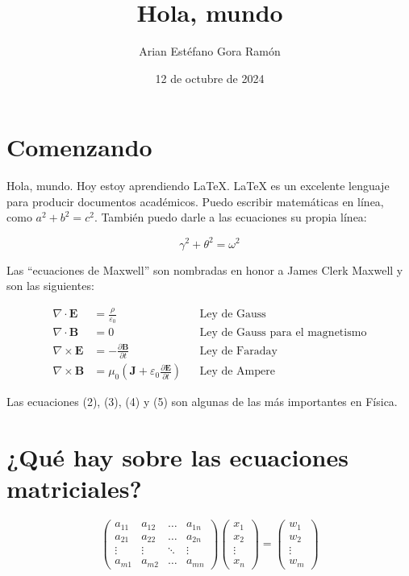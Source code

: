 \documentclass{article}
\title{Hola, mundo}
\author{Arian Estéfano Gora Ramón}
\date{12 de octubre de 2024}
\begin{document}
	
	\maketitle
	
	\section{Comenzando}
	
	Hola, mundo. Hoy estoy aprendiendo \LaTeX. \LaTeX{} es un excelente lenguaje para producir documentos académicos. Puedo escribir matemáticas en línea, como $a^2 + b^2 = c^2$. También puedo darle a las ecuaciones su propia línea:
	
	\begin{equation}
		\gamma^2 + \theta^2 = \omega^2
	\end{equation}
	
	Las ``ecuaciones de Maxwell'' son nombradas en honor a James Clerk Maxwell y son las siguientes:
	
	\begin{align}
		\nabla \cdot \mathbf{E} &= \frac{\rho}{\varepsilon_0} && \text{Ley de Gauss} \\
		\nabla \cdot \mathbf{B} &= 0 && \text{Ley de Gauss para el magnetismo} \\
		\nabla \times \mathbf{E} &= - \frac{\partial \mathbf{B}}{\partial t} && \text{Ley de Faraday} \\
		\nabla \times \mathbf{B} &= \mu_0 \left( \mathbf{J} + \varepsilon_0 \frac{\partial \mathbf{E}}{\partial t} \right) && \text{Ley de Ampere}
	\end{align}
	
	Las ecuaciones (2), (3), (4) y (5) son algunas de las más importantes en Física.
	
	\section{¿Qué hay sobre las ecuaciones matriciales?}
	
	\begin{equation}
		\begin{pmatrix}
			a_{11} & a_{12} & \dots  & a_{1n} \\
			a_{21} & a_{22} & \dots  & a_{2n} \\
			\vdots & \vdots & \ddots & \vdots \\
			a_{m1} & a_{m2} & \dots  & a_{mn}
		\end{pmatrix}
		\begin{pmatrix}
			x_1 \\
			x_2 \\
			\vdots \\
			x_n
		\end{pmatrix}
		=
		\begin{pmatrix}
			w_1 \\
			w_2 \\
			\vdots \\
			w_m
		\end{pmatrix}
	\end{equation}
	
\end{document}
